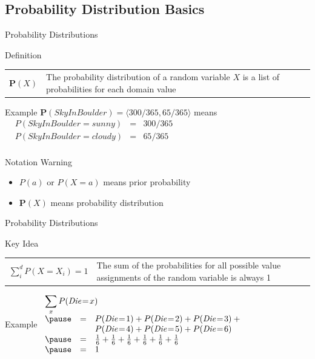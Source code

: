 \documentclass[14pt]{beamer}
\begin{document}
\subsection{Probability Distribution Basics}
\begin{frame}{Probability Distributions}
	\begin{block}{Definition}
		\begin{tabular}{lm{3.5in}@{}}
			\large $\mathbf{P}(X)$
			&
			The \alert{probability distribution} of a random variable $X$ is a list of probabilities for each domain value
		\end{tabular}
	\end{block}
	\pause
	\begin{block}{Example}
		$\mathbf{P}(\textit{SkyInBoulder}) = \langle 300/365, 65/365 \rangle$ means \\[.25em]
		$
		\begin{array}{llll}
			& P(\textit{SkyInBoulder}\!=\!\textit{sunny})  & = & 300/365 \\
			& P(\textit{SkyInBoulder}\!=\!\textit{cloudy}) & = & 65/365 \\
		\end{array}
		$
	\end{block}
	\pause
	\begin{block}{Notation Warning}
		\begin{itemize}
			\item $P(a)$ or $P(X\!=\!a)$ means prior probability
			\item $\mathbf{P}(X)$ means probability distribution
		\end{itemize}
	\end{block}
\end{frame}
\begin{frame}{Probability Distributions}
	\begin{block}{Key Idea}
		\begin{tabular}{lm{2.4in}@{}}
			\large $\sum\limits^{d}_{i}{P(X=X_{i})} = 1$
			&
			The sum of the probabilities for all possible value assignments of the random variable is always 1
		\end{tabular}
	\end{block}
	\pause
	\begin{block}{Example}
		$
		\begin{array}{lll}
			\lefteqn{\sum\limits_{x}{P(\textit{Die}\!=\!x)}} \\
			\pause
			& = & P(\textit{Die}\!=\!1) + P(\textit{Die}\!=\!2) + P(\textit{Die}\!=\!3) + \mbox{}\\
			&   & P(\textit{Die}\!=\!4) + P(\textit{Die}\!=\!5) + P(\textit{Die}\!=\!6) \\
			\pause
			& = & \frac{1}{6} + \frac{1}{6} + \frac{1}{6} + \frac{1}{6} + \frac{1}{6} + \frac{1}{6} \\
			\pause
			& = & 1
		\end{array}
		$
	\end{block}
\end{frame}
\end{document}
